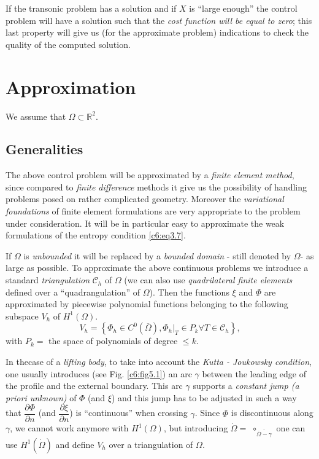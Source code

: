 \begin{remark}\label{c6:rem4.4}%
If the transonic problem has a solution and if $X$ is ``large enough'' 
the control problem will have a solution such that the {\em cost 
function will be equal to zero}; this last property will give us (for 
the approximate problem) indications to check the quality of the 
computed solution.     
\end{remark}

\section{Approximation}\label{c6:s5}%

We assume that $\Omega \subset \mathds{R}^2$.

\subsection{Generalities}\label{c6:ss5.1} 
The above control problem will be approximated by a \textit{finite 
element method}, since compared to \textit{finite difference} methods 
it give us the possibility of handling problems posed on rather 
complicated geometry. Moreover the \textit{variational foundations} of 
finite element formulations are very appropriate to the problem under 
consideration. It will be in particular easy to approximate the weak 
formulations of the entropy condition \eqref{c6:eq3.7}.       

If $\Omega$ is \textit{unbounded} it will be replaced by a 
\textit{bounded domain} - still denoted by $\Omega$- as large as 
possible.  To approximate the above continuous problems we introduce a 
standard \textit{triangulation} $\mathscr{C}_h$ of $\Omega$ (we can also use 
\textit{quadrilateral finite elements} defined over a 
``quadrangulation'' of $\Omega$). Then the functions $\xi$ and $\Phi$ 
are approximated by piecewise polynomial functions belonging to the 
following subspace $V_h $ of $H^1 (\Omega )$.       
\begin{equation}
V_h = \left\{ \Phi_h \in C^0 (\overline{\Omega}), \Phi_h |_T \in 
P_k \forall T \in \mathscr{C}_h \right\}, \tag{5.1}\label{c6:eq5.1}  
\end{equation}
with $P_k = $ the space of polynomials of degree $\leq k$. 

\begin{remark}\label{c6:rem5.1}%
In the\pageoriginale  case of a {\em lifting body}, to take into account the {\em 
Kutta - Joukowsky condition}, one usually introduces (see Fig. \ref{c6:fig5.1})  an 
arc $\gamma$ between the leading edge of the profile and the external 
boundary. This arc $\gamma$ supports a {\em constant jump (a priori 
unknown)} of $\Phi$ (and $\xi$) and this jump has to be adjusted in 
such a way that $\dfrac{\partial \Phi}{\partial n}$ (and 
$\dfrac{\partial \xi}{\partial n}$) is ``continuous'' when crossing 
$\gamma$. Since $\Phi$ is discontinuous along $\gamma$, we cannot work 
anymore with $H^1 (\Omega )$, but introducing $\dot{\Omega} =$ 
$\displaystyle{\mathop{\circ}_{\overline{\overline{\Omega} -
      \gamma}}}$ one can use $H^1 (\dot{\Omega})$  
and define $V_h$ over a triangulation of $\Omega$.           
\end{remark}

